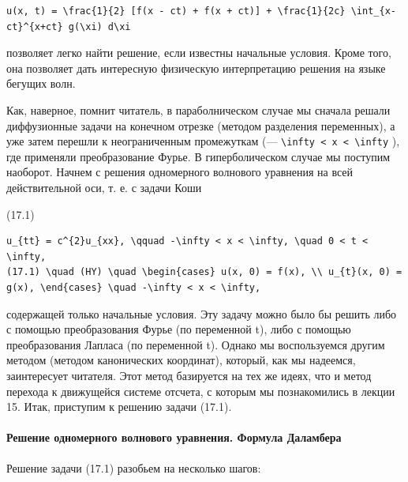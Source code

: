 \documentclass[
  ukrainian,
]{article}
\begin{document}
\begin{verbatim}
u(x, t) = \frac{1}{2} [f(x - ct) + f(x + ct)] + \frac{1}{2c} \int_{x-ct}^{x+ct} g(\xi) d\xi
\end{verbatim}

позволяет легко найти решение, если известны начальные условия. Кроме
того, она позволяет дать интересную физическую интерпретацию решения на
языке бегущих волн.

Как, наверное, помнит читатель, в параболническом случае мы сначала
решали диффузионные задачи на конечном отрезке (методом разделения
переменных), а уже затем перешли к неограниченным промежуткам (---
\texttt{\textbackslash{}infty\ \textless{}\ x\ \textless{}\ \textbackslash{}infty}
), где применяли преобразование Фурье. В гиперболическом случае мы
поступим наоборот. Начнем с решения одномерного волнового уравнения на
всей действительной оси, т. е. с задачи Коши

(17.1)

\begin{verbatim}
u_{tt} = c^{2}u_{xx}, \qquad -\infty < x < \infty, \quad 0 < t < \infty,
(17.1) \quad (HY) \quad \begin{cases} u(x, 0) = f(x), \\ u_{t}(x, 0) = g(x), \end{cases} \quad -\infty < x < \infty,
\end{verbatim}

содержащей только начальные условия. Эту задачу можно было бы решить
либо с помощью преобразования Фурье (по переменной t), либо с помощью
преобразования Лапласа (по переменной t). Однако мы воспользуемся другим
методом (методом канонических координат), который, как мы надеемся,
заинтересует читателя. Этот метод базируется на тех же идеях, что и
метод перехода к движущейся системе отсчета, с которым мы познакомились
в лекции 15. Итак, приступим к решению задачи (17.1).

\paragraph{Решение одномерного волнового уравнения. Формула
Даламбера}\label{ux440ux435ux448ux435ux43dux438ux435-ux43eux434ux43dux43eux43cux435ux440ux43dux43eux433ux43e-ux432ux43eux43bux43dux43eux432ux43eux433ux43e-ux443ux440ux430ux432ux43dux435ux43dux438ux44f.-ux444ux43eux440ux43cux443ux43bux430-ux434ux430ux43bux430ux43cux431ux435ux440ux430}

Решение задачи (17.1) разобьем на несколько шагов:
\end{document}
